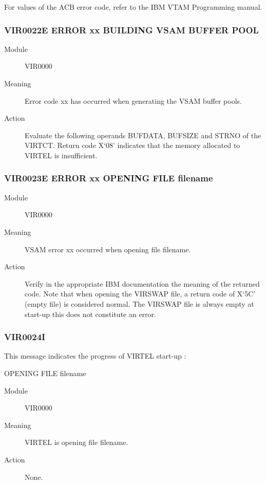 \documentclass[letterpaper,10pt,english]{sphinxmanual}
\begin{document}
For values of the ACB error code, refer to the IBM VTAM Programming manual.


\subsubsection{VIR0022E ERROR xx BUILDING VSAM BUFFER POOL}
\label{\detokenize{messages:vir0022e-error-xx-building-vsam-buffer-pool}}\begin{description}
\item[{Module}] \leavevmode
VIR0000

\item[{Meaning}] \leavevmode
Error code xx has occurred when generating the VSAM buffer pools.

\item[{Action}] \leavevmode
Evaluate the following operands BUFDATA, BUFSIZE and STRNO of the VIRTCT. Return code X‘08’ indicates that the memory allocated to VIRTEL is insufficient.

\end{description}


\subsubsection{VIR0023E ERROR xx OPENING FILE filename}
\label{\detokenize{messages:vir0023e-error-xx-opening-file-filename}}\begin{description}
\item[{Module}] \leavevmode
VIR0000

\item[{Meaning}] \leavevmode
VSAM error xx occurred when opening file filename.

\item[{Action}] \leavevmode
Verify in the appropriate IBM documentation the meaning of the returned code. Note that when opening the VIRSWAP file, a return code of X‘5C’ (empty file) is considered normal. The VIRSWAP file is always empty at start-up this does not constitute an error.

\end{description}


\subsubsection{VIR0024I}
\label{\detokenize{messages:vir0024i}}
This message indicates the progress of VIRTEL start-up :

OPENING FILE filename
\begin{description}
\item[{Module}] \leavevmode
VIR0000

\item[{Meaning}] \leavevmode
VIRTEL is opening file filename.

\item[{Action}] \leavevmode
None.

\end{description}
\end{document}
